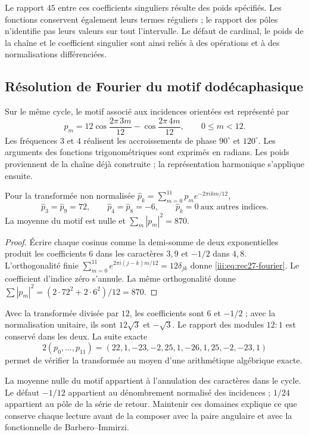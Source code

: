 Le rapport $45$ entre ces coefficients singuliers résulte des poids
spécifiés. Les fonctions conservent également leurs termes réguliers ;
le rapport des pôles n’identifie pas leurs valeurs sur tout l’intervalle.
Le défaut de cardinal, le poids de la chaîne et le coefficient singulier
sont ainsi reliés à des opérations et à des normalisations différenciées.

\clearpage
\subsection{Résolution de Fourier du motif dodécaphasique}

Sur le même cycle, le motif associé aux incidences orientées est
représenté par
\begin{equation}
 p_m=12\cos\frac{2\pi\,3m}{12}
      -\cos\frac{2\pi\,4m}{12},\qquad 0\le m<12.
 \label{iii:eq:rec27-patron}
\end{equation}
Les fréquences $3$ et $4$ réalisent les accroissements de phase $90^\circ$ et
$120^\circ$. Les arguments des fonctions trigonométriques sont
exprimés en radians. Les poids proviennent de la chaîne déjà construite ;
la représentation harmonique s’applique ensuite.

\begin{proposition}
\label{iii:prop:rec27-fourier}
Pour la transformée non normalisée
$\widehat p_k=\sum_{m=0}^{11}p_m e^{-2\pi i km/12}$,
\begin{equation}
 \widehat p_3=\widehat p_9=72,\qquad
 \widehat p_4=\widehat p_8=-6,
 \qquad \widehat p_k=0\ \text{aux autres indices}.
 \label{iii:eq:rec27-fourier}
\end{equation}
La moyenne du motif est nulle et
$\sum_m|p_m|^2=870$.
\end{proposition}
\begin{proof}
Écrire chaque cosinus comme la demi-somme de deux exponentielles produit
les coefficients $6$ dans les caractères $3,9$ et $-1/2$ dans $4,8$.
L’orthogonalité finie
$\sum_{m=0}^{11}e^{2\pi i(j-k)m/12}=12\delta_{jk}$
donne \eqref{iii:eq:rec27-fourier}. Le coefficient d’indice zéro
s’annule. La même orthogonalité donne
$\sum|p_m|^2=(2\cdot72^2+2\cdot6^2)/12=870$.
\end{proof}

Avec la transformée divisée par $12$, les coefficients sont $6$ et
$-1/2$ ; avec la normalisation unitaire, ils sont $12\sqrt3$ et $-\sqrt3$.
Le rapport des modules $12:1$ est conservé dans les deux. La suite exacte
\begin{equation}
 2(p_0,\ldots,p_{11})
 =(22,1,-23,-2,25,1,-26,1,25,-2,-23,1)
 \label{iii:eq:rec27-patron-racional}
\end{equation}
permet de vérifier la transformée au moyen d’une arithmétique algébrique exacte.

La moyenne nulle du motif appartient à l’annulation des caractères dans le
cycle. Le défaut $-1/12$ appartient au dénombrement normalisé des incidences ;
$1/24$ appartient au pôle de la série de retour. Maintenir ces domaines
explique ce que conserve chaque lecture avant de la composer avec la paire angulaire
et avec la fonctionnelle de Barbero--Immirzi.
